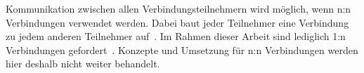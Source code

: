 Kommunikation zwischen allen Verbindungsteilnehmern wird möglich, wenn n:n Verbindungen verwendet werden.
Dabei baut jeder Teilnehmer eine Verbindung zu jedem anderen Teilnehmer auf~\cite{webrtc_mesh}.
Im Rahmen dieser Arbeit sind lediglich 1:n Verbindungen gefordert~\cite{aufgabenstellung}.
Konzepte und Umsetzung für n:n Verbindungen werden hier deshalb nicht weiter behandelt.

\clearpage
